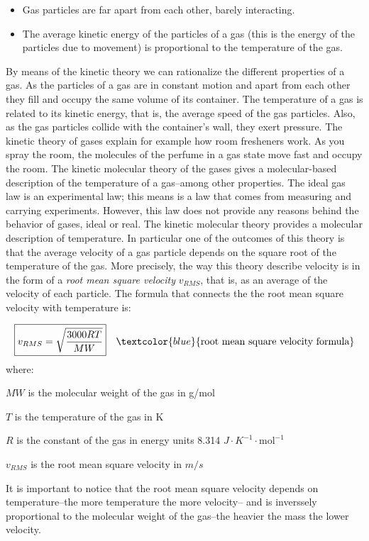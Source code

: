 \documentclass[main.tex]{subfiles}
\begin{document}
\begin{description}
\begin{itemize}
\item  Gas particles are far apart from each other, barely interacting.
\item The average kinetic energy of the particles of a gas (this is the energy of the particles due to movement) is proportional to the temperature of the gas.
\end{itemize}
By means of the kinetic theory we can rationalize the different properties of a gas. As the particles of a gas are in constant motion and apart from each other they fill and occupy the same volume of its container. The temperature of a gas is related to its kinetic energy, that is, the average speed of the gas particles. Also, as the gas particles collide with the container's wall, they exert pressure. The kinetic theory of gases explain for example how room fresheners work. As you spray the room, the molecules of the perfume in a gas state move fast and occupy the room.
The kinetic molecular theory of the gases gives a molecular-based description of the temperature of a gas--among other properties. The ideal gas law is an experimental law; this means is a law that comes from measuring and carrying experiments. However, this law does not provide any reasons behind the behavior of gases, ideal or real. The kinetic molecular theory provides a molecular description of temperature. In particular one of the outcomes of this theory is that the average velocity of a gas particle depends on the square root of the temperature of the gas. More precisely, the way this theory describe velocity is in the form of a \emph{root mean square velocity} $v_{RMS}$, that is, as an average of the velocity of each particle. The formula that connects the the root mean square velocity with temperature is:

\begin{equation*}\begin{split}
\boxed{  v_{RMS}=\sqrt{   \frac{3000RT}{MW} }   } \quad \textcolor{blue}{\text{root mean square velocity formula}}
\end{split}\end{equation*}
where:
\begin{where}
 \item $MW$   is the molecular weight of the gas in g/mol
\item $T$   is the temperature of the gas in K
\item $R$   is the constant of the gas in energy units 8.314 $J\cdot K^{-1}\cdot \text{mol}^{-1} $
\item $v_{RMS}$ is the root mean square velocity in $m/s$
\end{where}
It is important to notice that the root mean square velocity depends on temperature--the more temperature the more velocity-- and is inverssely proportional to the molecular weight of the gas--the heavier the mass the lower velocity.



\end{description}
\end{document}
